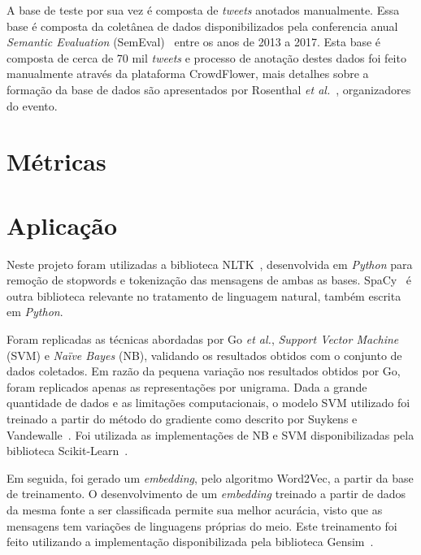 A base de teste por sua vez é composta de \textit{tweets} anotados manualmente.
Essa base é composta da coletânea de dados disponibilizados pela conferencia anual \textit{Semantic Evaluation}
(SemEval)~\cite{semeval17} entre os anos de 2013 a 2017.
Esta base é composta de cerca de 70 mil \textit{tweets} e processo de anotação destes dados foi feito manualmente através
da plataforma CrowdFlower, mais detalhes sobre a formação da base de dados são apresentados por Rosenthal
\textit{et al.}~\cite{rosenthal17}, organizadores do evento.

\section{Métricas}

\section{Aplicação}

Neste projeto foram utilizadas a biblioteca NLTK~\cite{nltk}, desenvolvida em \textit{Python} para remoção de stopwords
e tokenização das mensagens de ambas as bases.
SpaCy~\cite{spacy} é outra biblioteca relevante no tratamento de linguagem natural, também escrita em \textit{Python}.

Foram replicadas as técnicas abordadas por Go \textit{et al.}, \textit{Support Vector Machine} (SVM) e
\textit{Naïve Bayes} (NB), validando os resultados obtidos com o conjunto de dados coletados.
Em razão da pequena variação nos resultados obtidos por Go, foram replicados apenas as representações por unigrama.
Dada a grande quantidade de dados e as limitações computacionais, o modelo SVM utilizado foi treinado a partir do método
do gradiente como descrito por Suykens e Vandewalle~\cite{suykens99}.
Foi utilizada as implementações de NB e SVM disponibilizadas pela biblioteca Scikit-Learn~\cite{sklearn}.

Em seguida, foi gerado um \textit{embedding}, pelo algoritmo Word2Vec, a partir da base de treinamento.
O desenvolvimento de um \textit{embedding} treinado a partir de dados da mesma fonte a ser classificada permite sua
melhor acurácia, visto que as mensagens tem variações de linguagens próprias do meio.
Este treinamento foi feito utilizando a implementação disponibilizada pela biblioteca Gensim~\cite{gensim}.

